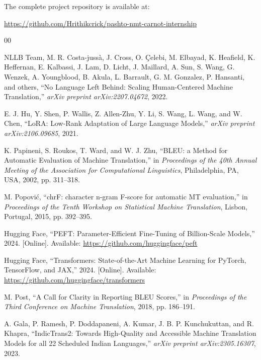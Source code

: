 \documentclass[conference]{IEEEtran}
\begin{document}
The complete project repository is available at:

\begin{center}
\url{https://github.com/Hrithikcrick/pashto-nmt-carnot-internship}
\end{center}

\begin{thebibliography}{00}

NLLB Team, M. R. Costa-jussà, J. Cross, O. Çelebi, M. Elbayad, K. Heafield, K. Heffernan, E. Kalbassi, J. Lam, D. Licht, J. Maillard, A. Sun, S. Wang, G. Wenzek, A. Youngblood, B. Akula, L. Barrault, G. M. Gonzalez, P. Hansanti, and others, ``No Language Left Behind: Scaling Human-Centered Machine Translation,'' \textit{arXiv preprint arXiv:2207.04672}, 2022.

E. J. Hu, Y. Shen, P. Wallis, Z. Allen-Zhu, Y. Li, S. Wang, L. Wang, and W. Chen, ``LoRA: Low-Rank Adaptation of Large Language Models,'' \textit{arXiv preprint arXiv:2106.09685}, 2021.

K. Papineni, S. Roukos, T. Ward, and W. J. Zhu, ``BLEU: a Method for Automatic Evaluation of Machine Translation,'' in \textit{Proceedings of the 40th Annual Meeting of the Association for Computational Linguistics}, Philadelphia, PA, USA, 2002, pp. 311--318.

M. Popovi\'c, ``chrF: character n-gram F-score for automatic MT evaluation,'' in \textit{Proceedings of the Tenth Workshop on Statistical Machine Translation}, Lisbon, Portugal, 2015, pp. 392--395.

Hugging Face, ``PEFT: Parameter-Efficient Fine-Tuning of Billion-Scale Models,'' 2024. [Online]. Available: \url{https://github.com/huggingface/peft}

Hugging Face, ``Transformers: State-of-the-Art Machine Learning for PyTorch, TensorFlow, and JAX,'' 2024. [Online]. Available: \url{https://github.com/huggingface/transformers}

M. Post, ``A Call for Clarity in Reporting BLEU Scores,'' in \textit{Proceedings of the Third Conference on Machine Translation}, 2018, pp. 186--191.

A. Gala, P. Ramesh, P. Doddapaneni, A. Kumar, J. B. P. Kunchukuttan, and R. Khapra, ``IndicTrans2: Towards High-Quality and Accessible Machine Translation Models for all 22 Scheduled Indian Languages,'' \textit{arXiv preprint arXiv:2305.16307}, 2023.

\end{thebibliography}
\end{document}
